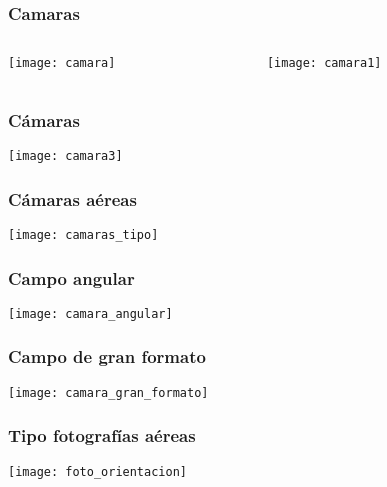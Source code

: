 \documentclass[14pt]{beamer}
\begin{document}
\begin{frame}
\frametitle{Camaras}
\begin{columns}
\begin{column}{0.66\linewidth}
\begin{center}
\texttt{[image: camara]}
\end{center}
\end{column}
\begin{column}{0.33\linewidth}
\begin{figure}
\texttt{[image: camara1]}
\end{figure}
\end{column}
\end{columns}
\end{frame}
\begin{frame}
\frametitle{Cámaras}
\begin{center}
\texttt{[image: camara3]}
\end{center}
\end{frame}
\begin{frame}
\frametitle{Cámaras aéreas}
\begin{center}
\texttt{[image: camaras\_tipo]}
\end{center}
\end{frame}
\begin{frame}
\frametitle{Campo angular}
\begin{center}
\texttt{[image: camara\_angular]}
\end{center}
\end{frame}
\begin{frame}
\frametitle{Campo de gran formato}
\begin{center}
\texttt{[image: camara\_gran\_formato]}
\end{center}
\end{frame}
\begin{frame}
\frametitle{Tipo fotografías aéreas}
\begin{center}
\texttt{[image: foto\_orientacion]}
\end{center}
\end{frame}
\end{document}
